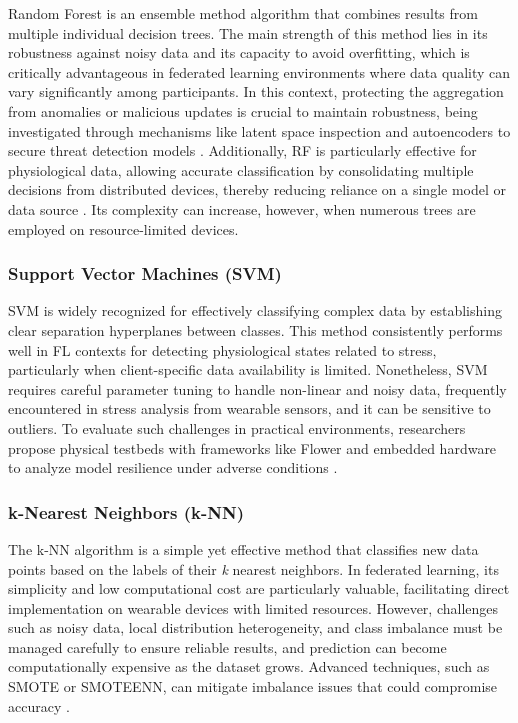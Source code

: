 \documentclass[12pt]{article}
\begin{document}
Random Forest is an ensemble method algorithm that combines results from multiple individual decision trees. The main strength of this method lies in its robustness against noisy data and its capacity to avoid overfitting, which is critically advantageous in federated learning environments where data quality can vary significantly among participants. In this context, protecting the aggregation from anomalies or malicious updates is crucial to maintain robustness, being investigated through mechanisms like latent space inspection and autoencoders to secure threat detection models \cite{tran_duc_luong_b5df10e8}. Additionally, RF is particularly effective for physiological data, allowing accurate classification by consolidating multiple decisions from distributed devices, thereby reducing reliance on a single model or data source \cite{adam_sadilek_c59c73f4}. Its complexity can increase, however, when numerous trees are employed on resource-limited devices.

\subsubsection{Support Vector Machines (SVM)}

SVM is widely recognized for effectively classifying complex data by establishing clear separation hyperplanes between classes. This method consistently performs well in FL contexts for detecting physiological states related to stress, particularly when client-specific data availability is limited. Nonetheless, SVM requires careful parameter tuning to handle non-linear and noisy data, frequently encountered in stress analysis from wearable sensors, and it can be sensitive to outliers. To evaluate such challenges in practical environments, researchers propose physical testbeds with frameworks like Flower and embedded hardware to analyze model resilience under adverse conditions \cite{hao_huang_8976046f}.

\subsubsection{k-Nearest Neighbors (k-NN)}

The k-NN algorithm is a simple yet effective method that classifies new data points based on the labels of their \textit{k} nearest neighbors. In federated learning, its simplicity and low computational cost are particularly valuable, facilitating direct implementation on wearable devices with limited resources. However, challenges such as noisy data, local distribution heterogeneity, and class imbalance must be managed carefully to ensure reliable results, and prediction can become computationally expensive as the dataset grows. Advanced techniques, such as SMOTE or SMOTEENN, can mitigate imbalance issues that could compromise accuracy \cite{abdulrahman_alahmadi_32bc288c}.
\end{document}
